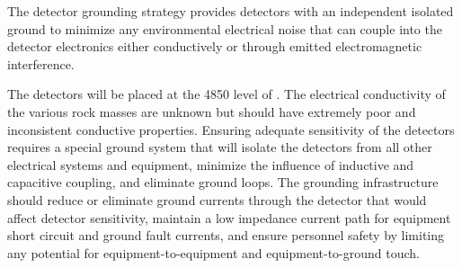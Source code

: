 The detector grounding strategy provides detectors with an independent
isolated ground to minimize any environmental electrical noise that
can couple into the detector electronics either conductively or
through emitted electromagnetic interference.


The detectors will be placed at the 4850 level of \surf. The
electrical conductivity of the various rock masses are unknown but
should have extremely poor and inconsistent conductive
properties. Ensuring adequate sensitivity of the detectors requires a
special ground system that will isolate the detectors from all other
electrical systems and equipment, minimize the influence of inductive
and capacitive coupling, and eliminate ground loops. The grounding
infrastructure should reduce or eliminate ground currents through the
detector that would affect detector sensitivity, maintain a low
impedance current path for equipment short circuit and ground fault
currents, and ensure personnel safety by limiting any potential for
equipment-to-equipment and equipment-to-ground touch.


